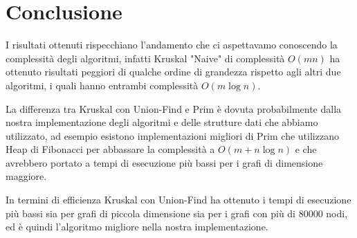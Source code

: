\section{Conclusione}
I risultati ottenuti rispecchiano l'andamento che ci aspettavamo conoscendo la complessità degli algoritmi, infatti Kruskal "Naive" di complessità $O(mn)$ ha ottenuto risultati peggiori di qualche ordine di grandezza rispetto agli altri due algoritmi, i quali hanno entrambi complessità $O(m\log{}n)$.

La differenza tra Kruskal con Union-Find e Prim è dovuta probabilmente dalla nostra implementazione degli algoritmi e delle strutture dati che abbiamo utilizzato, ad esempio esistono implementazioni migliori di Prim che utilizzano Heap di Fibonacci per abbassare la complessità a $O(m+n\log{}n)$ e che avrebbero portato a tempi di esecuzione più bassi per i grafi di dimensione maggiore.

In termini di efficienza Kruskal con Union-Find ha ottenuto i tempi di esecuzione più bassi sia per grafi di piccola dimensione sia per i grafi con più di 80000 nodi, ed è quindi l'algoritmo migliore nella nostra implementazione. 